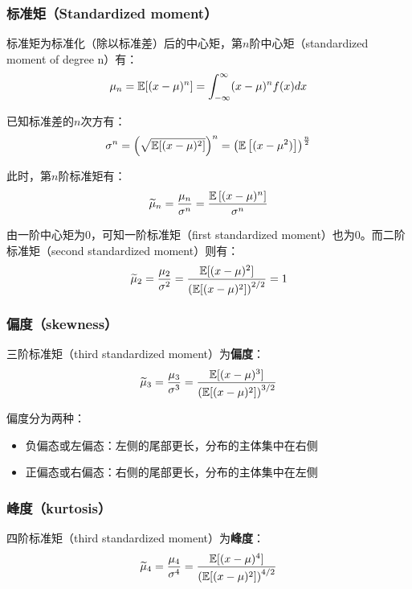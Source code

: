 \documentclass[11pt]{article}
\begin{document}
\subsubsection*{标准矩（Standardized moment）}

标准矩为标准化（除以标准差）后的中心矩，第$n$阶中心矩（standardized moment of degree n）有：
\begin{equation*}
    \mu_n = \mathbb{E}[(x-\mu)^n] = \int_{-\infty}^{\infty} (x-\mu)^n f(x)dx
\end{equation*}

已知标准差的$n$次方有：
\begin{equation*}
    \sigma^n = \left(\sqrt{\mathbb{E}[(x-\mu)^2]}\right)^n = \left( \mathbb{E} \left[ (x-\mu^2)\right]\right)^{\frac{n}{2}}
\end{equation*}

此时，第$n$阶标准矩有：
\begin{equation*}
    \widetilde{\mu}_n = \frac{\mu_n}{\sigma^n} = \frac{\mathbb{E}\left[(x-\mu)^n\right]}{\sigma^n}
\end{equation*}

由一阶中心矩为$0$，可知一阶标准矩（first standardized moment）也为$0$。而二阶标准矩（second standardized moment）则有：
\begin{equation*}
    \widetilde{\mu}_2 = \frac{\mu_2}{\sigma^2} = \frac{\mathbb{E}[(x-\mu)^2]}{\left(\mathbb{E}[(x-\mu)^2]\right)^{2/2}} = 1
\end{equation*}

\subsubsection*{偏度（skewness）}

三阶标准矩（third standardized moment）为\textbf{偏度}：
\begin{equation*}
    \widetilde{\mu}_3 = \frac{\mu_3}{\sigma^3} = \frac{\mathbb{E}[(x-\mu)^3]}{\left(\mathbb{E}[(x-\mu)^2]\right)^{3/2}}
\end{equation*}

偏度分为两种：
\begin{itemize}
    \item 负偏态或左偏态：左侧的尾部更长，分布的主体集中在右侧
    \item 正偏态或右偏态：右侧的尾部更长，分布的主体集中在左侧
\end{itemize}

\subsubsection*{峰度（kurtosis）}
四阶标准矩（third standardized moment）为\textbf{峰度}：
\begin{equation*}
    \widetilde{\mu}_4 = \frac{\mu_4}{\sigma^4} = \frac{\mathbb{E}[(x-\mu)^4]}{\left(\mathbb{E}[(x-\mu)^2]\right)^{4/2}} 
\end{equation*}
\end{document}
